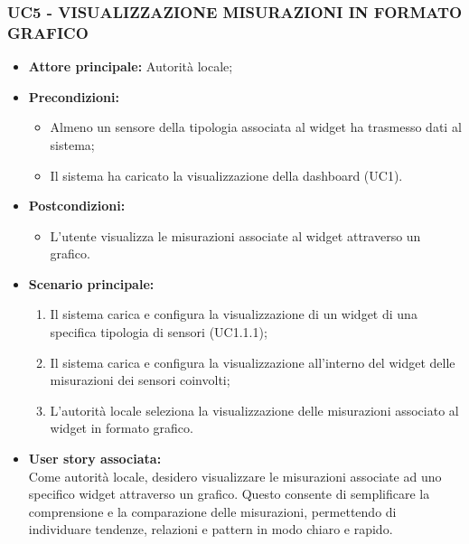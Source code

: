 \subsubsection{UC5 - VISUALIZZAZIONE MISURAZIONI IN FORMATO GRAFICO}
\begin{itemize}
    \item \textbf{Attore principale:} Autorità locale;
    \item \textbf{Precondizioni:}
        \begin{itemize}
            \item Almeno un sensore della tipologia associata al widget ha trasmesso dati al sistema;
            \item Il sistema ha caricato la visualizzazione della dashboard (UC1). 
        \end{itemize}
    \item \textbf{Postcondizioni:}
        \begin{itemize}
            \item L'utente visualizza le misurazioni associate al widget attraverso un grafico.
        \end{itemize}
    \item \textbf{Scenario principale:}
        \begin{enumerate}
            \item Il sistema carica e configura la visualizzazione di un widget di una specifica tipologia di sensori (UC1.1.1);
                \item Il sistema carica e configura la visualizzazione all'interno del widget delle misurazioni dei sensori coinvolti;
                \item L'autorità locale seleziona la visualizzazione delle misurazioni associato al widget in formato grafico.
        \end{enumerate}
    \item \textbf{User story associata:} \\
        Come autorità locale, desidero visualizzare le misurazioni associate ad uno specifico widget attraverso un grafico. Questo consente di semplificare la comprensione e la comparazione delle misurazioni, permettendo di individuare tendenze, relazioni e pattern in modo chiaro e rapido.
\end{itemize}